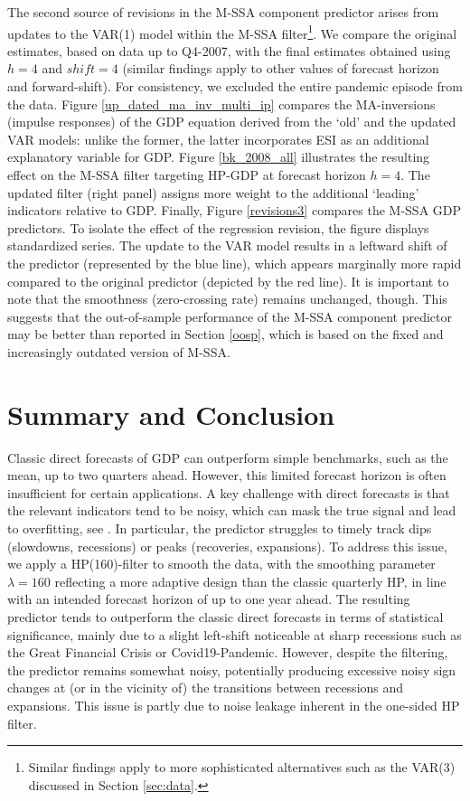 \documentclass[11pt,a4paper]{article}
\begin{document}
The second source of revisions in the M-SSA component predictor arises from updates to the VAR(1) model within the M-SSA filter\footnote{Similar findings apply to more sophisticated alternatives such as the VAR(3) discussed in Section \ref{sec:data}.}. We compare the original estimates, based on data up to Q4-2007, with the final estimates obtained using $h=4$ and $shift=4$ (similar findings apply to other values of forecast horizon and forward-shift).  For consistency, we excluded the entire pandemic episode from the data. Figure \ref{up_dated_ma_inv_multi_ip} compares the MA-inversions (impulse responses) of the GDP equation derived from the `old' and the updated VAR models: unlike the former, the latter incorporates ESI as an additional explanatory variable for GDP. Figure \ref{bk_2008_all} illustrates the resulting effect on the M-SSA filter targeting HP-GDP at forecast horizon $h=4$. The updated filter (right panel) assigns more weight to the additional `leading' indicators relative to GDP. Finally, Figure \ref{revisions3} compares the M-SSA GDP predictors. To isolate the effect of the regression revision, the figure displays standardized series. The update to the VAR model results in a leftward shift of the predictor (represented by the blue line), which appears marginally more rapid compared to the original predictor (depicted by the red line). It is important to note that the smoothness (zero-crossing rate) remains unchanged, though. 
This suggests that the out-of-sample performance of the M-SSA component predictor may be better than reported in Section \ref{oosp}, which is based on the fixed and increasingly outdated version of M-SSA.


\section{Summary and Conclusion}\label{sec:conclusions}


Classic direct forecasts of GDP can outperform simple benchmarks, such as the mean, up to two quarters ahead. However, this limited forecast horizon is often insufficient for certain applications. A key challenge with direct forecasts is that the relevant indicators tend to be noisy, which can mask the true signal and lead to overfitting, see \cite{Hastie2009}. In particular, the predictor struggles to timely track dips (slowdowns, recessions) or peaks (recoveries, expansions). To address this issue, we apply a HP(160)-filter to smooth the data, with the smoothing parameter $\lambda=160$ reflecting a more adaptive design than the classic quarterly HP, in line with an intended forecast horizon of up to one year ahead. The resulting predictor tends to outperform the classic direct forecasts in terms of statistical significance, mainly due to a slight left-shift noticeable at sharp recessions such as the Great Financial Crisis or Covid19-Pandemic. However, despite the filtering, the predictor remains somewhat noisy, potentially producing excessive noisy sign changes at (or in the vicinity of) the transitions between recessions and expansions. This issue is partly due to noise leakage inherent in the one-sided HP filter. \\
\end{document}
